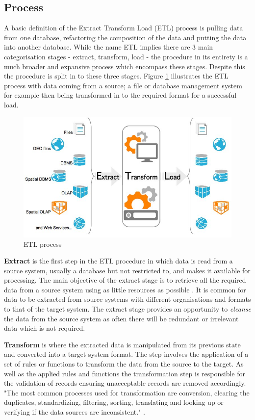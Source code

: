\subsection{Process}\label{etlprocess}
A basic definition of the Extract Transform Load (ETL) process is pulling data from one database, refactoring the composition of the data and putting the data into another database. While the name ETL implies there are 3 main categorisation stages - extract, transform, load - the procedure in its entirety is a much broader and expansive process which encompass these stages. Despite this the procedure is split in to these three stages. Figure \ref{fig:etl} illustrates the ETL process with data coming from a source; a file or database management system for example then being transformed in to the required format for a successful load. \begin{figure}[h]\begin{center}\includegraphics[width=0.8\linewidth]{images/etl.jpg}\caption{ETL process}\label{fig:etl}\end{center}\end{figure}

\textbf{Extract} is the first step in the ETL procedure in which data is read from a source system, usually a database but not restricted to, and makes it available for processing. The main objective of the extract stage is to retrieve all the required data from a source system using as little resources as possible \cite{etlref1}. It is common for data to be extracted from source systems with different organisations and formats to that of the target system. The extract stage provides an opportunity to \textit{cleanse} the data from the source system as often there will be redundant or irrelevant data which is not required.

\textbf{Transform} is where the extracted data is manipulated from its previous state and converted into a target system format. The step involves the application of a set of rules or functions to transform the data from the source to the target. As well as the applied rules and functions the transformation step is responsible for the validation of records ensuring unacceptable records are removed accordingly. "The most common processes used for transformation are conversion, clearing the duplicates, standardizing, filtering, sorting, translating and looking up or verifying if the data sources are inconsistent." \cite{etlref2}.

